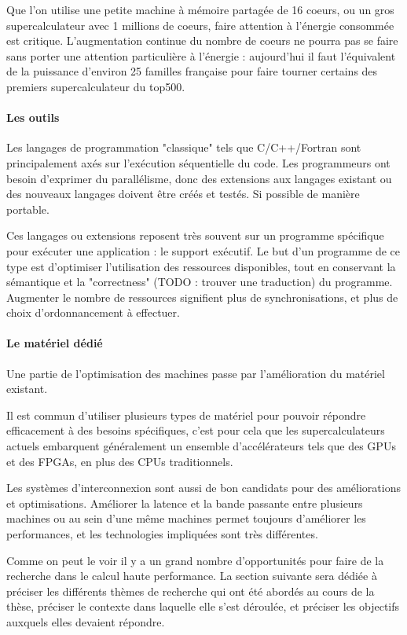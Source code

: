 Que l'on utilise une petite machine à mémoire partagée de 16 coeurs, ou un gros supercalculateur avec 1 millions de coeurs, faire attention à l'énergie consommée est critique.
L'augmentation continue du nombre de coeurs ne pourra pas se faire sans porter une attention particulière à l'énergie : aujourd'hui il faut l'équivalent de la puissance d'environ 25 familles française pour faire tourner certains des premiers supercalculateur du top500.

\paragraph{Les outils}

Les langages de programmation "classique" tels que C/C++/Fortran sont principalement axés sur l'exécution séquentielle du code.
Les programmeurs ont besoin d'exprimer du parallélisme, donc des extensions aux langages existant ou des nouveaux langages doivent être créés et testés. Si possible de manière portable.

Ces langages ou extensions reposent très souvent sur un programme spécifique pour exécuter une application : le support exécutif.
Le but d'un programme de ce type est d'optimiser l'utilisation des ressources disponibles, tout en conservant la sémantique et la "correctness" (TODO : trouver une traduction) du programme.
Augmenter le nombre de ressources signifient plus de synchronisations, et plus de choix d'ordonnancement à effectuer.

\paragraph{Le matériel dédié}

Une partie de l'optimisation des machines passe par l'amélioration du matériel existant.

Il est commun d'utiliser plusieurs types de matériel pour pouvoir répondre efficacement à des besoins spécifiques, c'est pour cela que les supercalculateurs actuels embarquent généralement un ensemble d'accélérateurs tels que des GPUs et des FPGAs, en plus des CPUs traditionnels.

Les systèmes d'interconnexion sont aussi de bon candidats pour des améliorations et optimisations.
Améliorer la latence et la bande passante entre plusieurs machines ou au sein d'une même machines permet toujours d'améliorer les performances, et les technologies impliquées sont très différentes.



Comme on peut le voir il y a un grand nombre d'opportunités pour faire de la recherche dans le calcul haute performance.
La section suivante sera dédiée à préciser les différents thèmes de recherche qui ont été abordés au cours de la thèse, préciser le contexte dans laquelle elle s'est déroulée, et préciser les objectifs auxquels elles devaient répondre.





